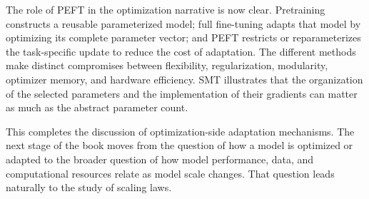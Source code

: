 The role of PEFT in the optimization narrative is now clear. Pretraining
constructs a reusable parameterized model; full fine-tuning adapts that model
by optimizing its complete parameter vector; and PEFT restricts or
reparameterizes the task-specific update to reduce the cost of adaptation.
The different methods make distinct compromises between flexibility,
regularization, modularity, optimizer memory, and hardware efficiency.
SMT illustrates that the organization of the selected parameters and the
implementation of their gradients can matter as much as the abstract
parameter count.

This completes the discussion of optimization-side adaptation mechanisms.
The next stage of the book moves from the question of how a model is
optimized or adapted to the broader question of how model performance,
data, and computational resources relate as model scale changes. That
question leads naturally to the study of scaling laws.
